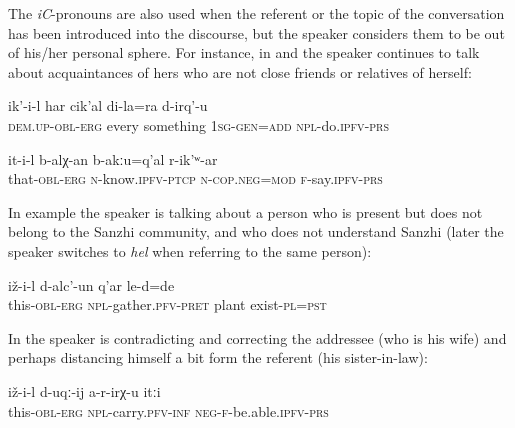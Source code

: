 The \textit{iC}-pronouns are also used when the referent or the topic of the conversation has been introduced into the discourse, but the speaker considers them to be out of his/her personal sphere. For instance, in  and  the speaker continues to talk about acquaintances of hers who are not close friends or relatives of herself:
%
\begin{exe}
		\label{In Urkarakh there is this son of my friend}
	\sn
	\gll	ik'-i-l	har	cik'al	di-la=ra	d-irq'-u\\
		\textsc{dem.up-obl}-\textsc{erg} 	every	something	\textsc{1sg}-\textsc{gen}=\textsc{add}	\textsc{npl}-do.\textsc{ipfv}-\textsc{prs}\\
	\glt	{}

	\ex	\label{She does not know anything, (my daughter) says.2}
	\gll	it-i-l	b-alχ-an	b-akːu=q'al	r-ik'ʷ-ar\\
		that-\textsc{obl}-\textsc{erg}	\textsc{n}-know.\textsc{ipfv}-\textsc{ptcp}	\textsc{n}-\textsc{cop.neg}=\textsc{mod}	\textsc{f}-say.\textsc{ipfv-prs}\\
	\glt	{}
\end{exe}

In example  the speaker is talking about a person who is present but does not belong to the Sanzhi community, and who does not understand Sanzhi (later the speaker switches to \textit{hel} when referring to the same person):
%
\begin{exe}
	\ex	\label{There were plants that she gathered.}
	\gll	iž-i-l	d-alc'-un	q'ar	le-d=de\\
		this-\textsc{obl}-\textsc{erg}	\textsc{npl}-gather.\textsc{pfv}-\textsc{pret}	plant	exist-\textsc{pl}=\textsc{pst}\\
	\glt	{}
\end{exe}

In  the speaker is contradicting and correcting the addressee (who is his wife) and perhaps distancing himself a bit form the referent (his sister-in-law):
%
\begin{exe}
	\label{Prepare (the groceries), when your little sister comes,}
	\sn
	\gll	iž-i-l	d-uqː-ij	a-r-irχ-u	itːi\\
		this-\textsc{obl}-\textsc{erg}	\textsc{npl}-carry.\textsc{pfv}-\textsc{inf}	\textsc{neg}-\textsc{f}-be.able.\textsc{ipfv}-\textsc{prs} \\
	\glt	{}
\end{exe}


